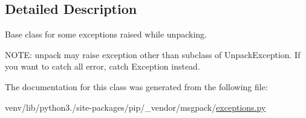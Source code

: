 \subsection{Detailed Description}
\begin{DoxyVerb}Base class for some exceptions raised while unpacking.

NOTE: unpack may raise exception other than subclass of
UnpackException.  If you want to catch all error, catch
Exception instead.
\end{DoxyVerb}
 

The documentation for this class was generated from the following file\+:\begin{DoxyCompactItemize}
\item 
venv/lib/python3./site-\/packages/pip/\+\_\+vendor/msgpack/\hyperlink{pip_2__vendor_2msgpack_2exceptions_8py}{exceptions.\+py}\end{DoxyCompactItemize}
